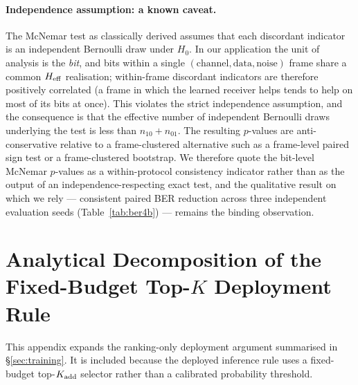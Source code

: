 \paragraph{Independence assumption: a known caveat.}
The McNemar test as classically derived assumes that each discordant indicator is an independent Bernoulli draw under $H_0$. In our application the unit of analysis is the \emph{bit}, and bits within a single $(\mathrm{channel}, \mathrm{data}, \mathrm{noise})$ frame share a common $H_{\mathrm{eff}}$ realisation; within-frame discordant indicators are therefore positively correlated (a frame in which the learned receiver helps tends to help on most of its bits at once). This violates the strict independence assumption, and the consequence is that the effective number of independent Bernoulli draws underlying the test is less than $n_{10} + n_{01}$. The resulting $p$-values are anti-conservative relative to a frame-clustered alternative such as a frame-level paired sign test or a frame-clustered bootstrap. We therefore quote the bit-level McNemar $p$-values as a within-protocol consistency indicator rather than as the output of an independence-respecting exact test, and the qualitative result on which we rely --- consistent paired BER reduction across three independent evaluation seeds (Table~\ref{tab:ber4b}) --- remains the binding observation.

\section{Analytical Decomposition of the Fixed-Budget Top-$K$ Deployment Rule}
\label{app:topk_patch}

This appendix expands the ranking-only deployment argument summarised in
\S\ref{sec:training}. It is included because the deployed inference rule
uses a fixed-budget top-$K_{\mathrm{add}}$ selector rather than a calibrated
probability threshold.

